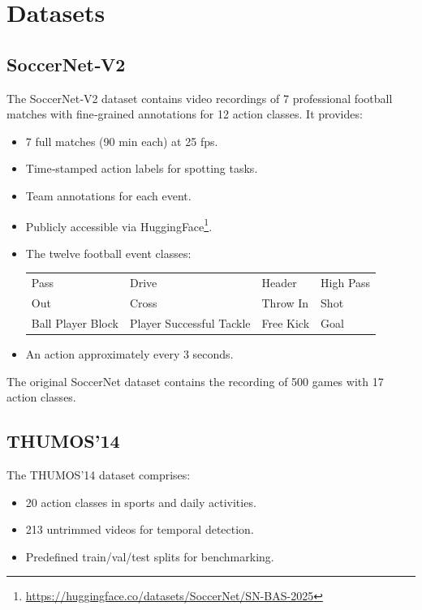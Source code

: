 \section{Datasets}
\label{sec:datasets}


\subsection{SoccerNet‑V2}
\label{ssec:soccernet}

The SoccerNet‑V2 dataset \cite{deliege_soccernet-v2_dataset_2021} contains video recordings of 7 professional football matches with fine‑grained annotations for 12 action classes. It provides:
\begin{itemize}
    \item 7 full matches (90 min each) at 25 fps.
    \item Time‑stamped action labels for spotting tasks.
    \item Team annotations for each event.
    \item Publicly accessible via HuggingFace\footnote{\url{https://huggingface.co/datasets/SoccerNet/SN-BAS-2025}}.
    \item The twelve football event classes:
        \begin{center}
            \begin{tabular}{llll}
                Pass & Drive & Header & High Pass \\
                Out & Cross & Throw In & Shot \\
                Ball Player Block & Player Successful Tackle & Free Kick & Goal
            \end{tabular}
        \end{center}
    \item An action approximately every 3 seconds. 
\end{itemize}

The original SoccerNet dataset contains the recording of 500 games with 17 action classes. 


\subsection{THUMOS'14}
\label{ssec:thumos}

The THUMOS'14 dataset \cite{dataset:thumos} comprises:
\begin{itemize}
    \item 20 action classes in sports and daily activities.
    \item 213 untrimmed videos for temporal detection.
    \item Predefined train/val/test splits for benchmarking.
\end{itemize}

